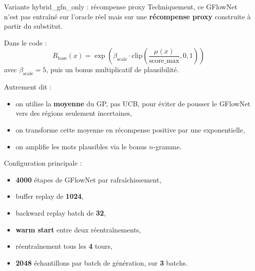 \documentclass[aspectratio=169,10pt]{beamer}
\begin{document}
\begin{frame}{Variante hybrid\_gfn\_only : récompense proxy}
\justifying
\small
Techniquement, ce GFlowNet n'est pas entraîné sur l'oracle réel mais sur une
\textbf{récompense proxy} construite à partir du substitut.

\vspace{0.4em}
Dans le code :
\[
R_{\text{base}}(x)=\exp\!\left(\beta_{\text{scale}}
\cdot \mathrm{clip}\!\left(\frac{\mu(x)}{\text{score\_max}},0,1\right)\right)
\]
avec \(\beta_{\text{scale}}=5\), puis un bonus multiplicatif de plausibilité.

\vspace{0.4em}
Autrement dit :
\begin{itemize}
  \item on utilise la \textbf{moyenne} du GP, pas UCB, pour éviter de pousser
  le GFlowNet vers des régions seulement incertaines,
  \item on transforme cette moyenne en récompense positive par une exponentielle,
  \item on amplifie les mots plausibles via le bonus \(n\)-gramme.
\end{itemize}

\vspace{0.4em}
Configuration principale :
\begin{itemize}
  \item \textbf{4000} étapes de GFlowNet par rafraîchissement,
  \item buffer replay de \textbf{1024},
  \item backward replay batch de \textbf{32},
  \item \textbf{warm start} entre deux réentraînements,
  \item réentraînement tous les \textbf{4} tours,
  \item \textbf{2048} échantillons par batch de génération, sur \textbf{3} batchs.
\end{itemize}
\end{frame}
\end{document}
